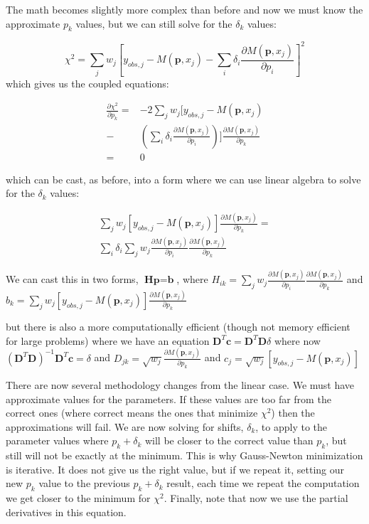 The math becomes slightly more complex than before and now we must know the approximate $p_k$ values, but we can still solve for the $\delta_k$ values:

$$\chi^2 = \sum_j w_j[y_{obs,j}-M(\mathbf{p},x_j) - 
\sum_i \delta_i  \frac{\partial M(\textbf{p},x_j)}{\partial p_i}]^2$$ which gives us the coupled equations:

\begin{align}
  \frac{\partial\chi^2}{\partial p_k} =& 
-2\sum_j w_j[y_{obs,j}-M(\mathbf{p},x_j)\\
-&(\sum_i \delta_i  \frac{\partial M(\textbf{p},x_j)}{\partial p_i})]\frac{\partial M(\mathbf{p},x_j)}{\partial p_k}\\ =& 0
\end{align}

which can be cast, as before, into a form where we can use linear algebra to solve for the $\delta_k$ values:
 
\begin{align}
     \sum_j w_j[y_{obs,j}-M(\mathbf{p},x_j)]\frac{\partial M(\mathbf{p},x_j)}{\partial p_k}
 = \\
 \sum_i \delta_i  \sum_j w_j  \frac{\partial M(\textbf{p},x_j)}{\partial p_i}\frac{\partial M(\mathbf{p},x_j)}{\partial p_k}
 \end{align}
 

We can cast this in two forms, $\textbf{H} \textbf{p} =  \textbf{b}$, where $H_{ik} = \sum_j w_j  \frac{\partial M(\textbf{p},x_j)}{\partial p_i}\frac{\partial M(\mathbf{p},x_j)}{\partial p_k}$ and $b_k =  \sum_j w_j[y_{obs,j}-M(\mathbf{p},x_j)]\frac{\partial M(\mathbf{p},x_j)}{\partial p_k}$

but there is also a more computationally efficient (though not memory efficient for large problems) where we have an equation $\textbf{D}^T \textbf{c} = \textbf{D}^T\textbf{D}\delta$ where now $(\textbf{D}^T\textbf{D})^{-1} \textbf{D}^T \textbf{c} = \delta$ and $D_{jk} = \sqrt{w_j}  \frac{\partial M(\textbf{p},x_j)}{\partial p_k}$ and  $c_j =  \sqrt{w_j}[y_{obs,j}-M(\mathbf{p},x_j)]$

There are now several methodology changes from the linear case. We must have approximate values for the parameters. If these values are too far from the correct ones (where correct means the ones that minimize $\chi^2$) then the approximations will fail. We are now solving for shifts, $\delta_k$, to apply to the parameter values where $p_k + \delta_k$ will be closer to the correct value than $p_k$, but still will not be exactly at the minimum. This is why Gauss-Newton minimization is iterative. It does not give us the right value, but if we repeat it, setting our new $p_k$ value to the previous $p_k + \delta_k$ result, each time we repeat the computation we get closer to the minimum for $\chi^2$.  Finally, note that now we use the partial derivatives in this equation. 

